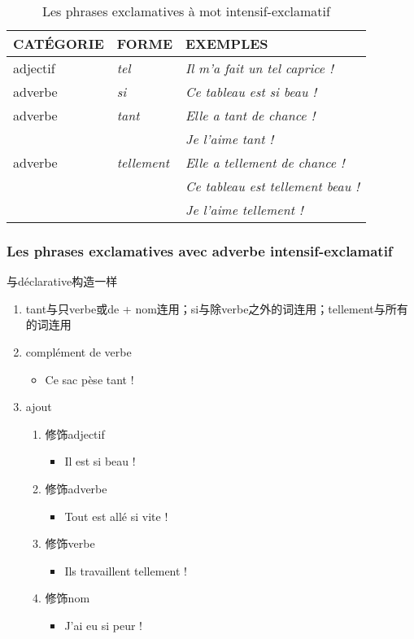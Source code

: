 \documentclass[UTF8]{report}
\begin{document}
\begin{table}[H]
    \centering 
    \begin{tabular}{|l|l|l|}
    \hline
    \rowcolor{cyan!20}
    \textbf{CATÉGORIE} & \textbf{FORME} & \textbf{EXEMPLES} \\
    \hline
    adjectif & \textit{tel} & \textit{Il m'a fait un tel caprice !} \\
    \hline
    adverbe & \textit{si} & \textit{Ce tableau est si beau !} \\
    \hline
    adverbe & \textit{tant} & \textit{Elle a tant de chance !} \\
    & & \textit{Je l'aime tant !} \\
    \hline
    adverbe & \textit{tellement} & \textit{Elle a tellement de chance !} \\
    & & \textit{Ce tableau est tellement beau !} \\
    & & \textit{Je l'aime tellement !} \\
    \hline
    \end{tabular}
\caption{Les phrases exclamatives à mot intensif-exclamatif}
\end{table}

\subsubsection{Les phrases exclamatives avec adverbe intensif-exclamatif}
与déclarative构造一样
\begin{enumerate}
    \item tant与只verbe或de + nom连用；si与除verbe之外的词连用；tellement与所有的词连用
    \item complément de verbe
    \begin{itemize}
        \item Ce sac pèse tant !
    \end{itemize}
    \item ajout 
    \begin{enumerate}
        \item 修饰adjectif
        \begin{itemize}
            \item Il est si beau !
        \end{itemize}
        \item 修饰adverbe
        \begin{itemize}
            \item Tout est allé si vite !
        \end{itemize}
        \item 修饰verbe 
        \begin{itemize}
            \item Ils travaillent tellement !
        \end{itemize}
        \item 修饰nom
        \begin{itemize}
            \item J’ai eu si peur !
        \end{itemize}
    \end{enumerate}
\end{enumerate}
\end{document}
